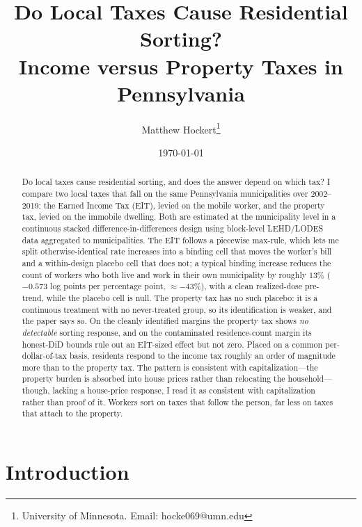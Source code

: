 \documentclass[12pt]{article}
\title{Do Local Taxes Cause Residential Sorting? \\
\large Income versus Property Taxes in Pennsylvania}
\author{Matthew Hockert\thanks{University of Minnesota. Email: hocke069@umn.edu}}
\date{\today}
\begin{document}
\maketitle

\begin{abstract}
Do local taxes cause residential sorting, and does the answer depend
on which tax? I compare two local taxes that fall on the same
Pennsylvania municipalities over 2002--2019: the Earned Income Tax
(EIT), levied on the mobile worker, and the property tax, levied on
the immobile dwelling. Both are estimated at the municipality level in
a continuous stacked difference-in-differences design using block-level
LEHD/LODES data aggregated to municipalities. The EIT follows a
piecewise max-rule, which lets me split otherwise-identical rate
increases into a binding cell that moves the worker's bill and a
within-design placebo cell that does not; a typical binding increase
reduces the count of workers who both live and work in their own
municipality by roughly $13\%$ ($-0.573$ log points per percentage
point, $\approx -43\%$), with a clean realized-dose pre-trend, while the
placebo cell is null. The property tax has no such placebo: it is a
continuous treatment with no never-treated group, so its identification
is weaker, and the paper says so. On the cleanly identified margins the
property tax shows \emph{no detectable} sorting response, and on the
contaminated residence-count margin its honest-DiD bounds rule out an
EIT-sized effect but not zero. Placed on a common per-dollar-of-tax
basis, residents respond to the income tax roughly an order of
magnitude more than to the property tax. The pattern is consistent with
capitalization---the property burden is absorbed into house prices
rather than relocating the household---though, lacking a house-price
response, I read it as consistent with capitalization rather than proof
of it. Workers sort on taxes that follow the person, far less on taxes
that attach to the property.
\end{abstract}

\newpage

\section{Introduction}
\label{sec:intro}
\end{document}
